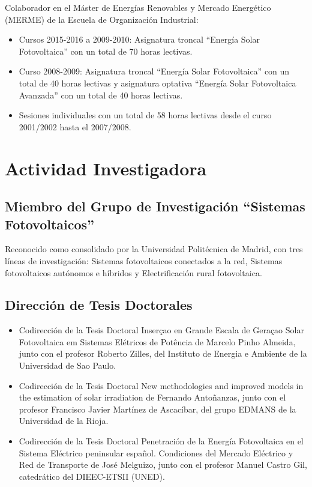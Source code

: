 \documentclass[article, a4paper]{memoir}
\begin{document}
Colaborador en el Máster de Energías Renovables y Mercado Energético (MERME) de la Escuela de Organización Industrial:

\begin{itemize}
\item Cursos 2015-2016 a 2009-2010: Asignatura troncal ``Energía Solar Fotovoltaica'' con un total de 70 horas lectivas.

\item Curso 2008-2009: Asignatura troncal ``Energía Solar Fotovoltaica'' con un total de 40 horas lectivas y asignatura optativa ``Energía Solar Fotovoltaica Avanzada'' con un total de 40 horas lectivas.

\item Sesiones individuales con un total de 58 horas lectivas desde el curso 2001/2002 hasta el 2007/2008.
\end{itemize}


\section{Actividad Investigadora}
\label{sec:orgheadline20}

\subsection{Miembro del Grupo de Investigación ``Sistemas Fotovoltaicos''}
\label{sec:orgheadline14}

Reconocido como consolidado por la Universidad Politécnica de Madrid, con tres líneas de investigación: Sistemas fotovoltaicos conectados a la red, Sistemas fotovoltaicos autónomos e híbridos y Electrificación rural fotovoltaica.

\subsection{Dirección de Tesis Doctorales}
\label{sec:orgheadline15}

\begin{itemize}
\item Codirección de la Tesis Doctoral \guillemotleft{}Inserçao en Grande Escala de Geraçao Solar Fotovoltaica em Sistemas Elétricos de Potência\guillemotright{} de Marcelo Pinho Almeida, junto con el profesor Roberto Zilles, del Instituto de Energia e Ambiente de la Universidad de Sao Paulo.

\item Codirección de la Tesis Doctoral \guillemotleft{}New methodologies and improved models in the estimation of solar irradiation\guillemotright{} de Fernando Antoñanzas, junto con el profesor Francisco Javier Martínez de Ascacíbar, del grupo EDMANS de la Universidad de la Rioja.

\item Codirección de la Tesis Doctoral \guillemotleft{}Penetración de la Energía Fotovoltaica en el Sistema Eléctrico peninsular español. Condiciones del Mercado Eléctrico y Red de Transporte\guillemotright{} de José Melguizo, junto con el profesor Manuel Castro Gil, catedrático del DIEEC-ETSII (UNED).
\end{itemize}
\end{document}
